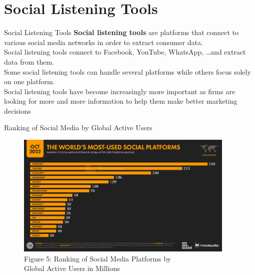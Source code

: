 \documentclass[pdf]{beamer}
\newcommand{\empr}[1]{{\color{franklinblue}\textbf{#1}}}
\theoremstyle{remark}
\theoremstyle{definition}
\begin{document}
\section{Social Listening Tools}

\begin{frame}[t]{Social Listening Tools}
\empr{Social listening tools} are platforms that connect to various social media networks in order to extract consumer data.  \\
\vspace{1.5ex}
Social listening tools connect to Facebook, YouTube, WhatsApp, \ldots and extract data from them. \\
\vspace{1.5ex}
Some social listening tools can handle several platforms while others focus solely on one platform. \\
\vspace{1.5ex}
Social listening tools have become increasingly more important as firms are looking for more and more information to help them make better marketing decisions
\end{frame}

\begin{frame}[t]{Ranking of Social Media by Global Active Users}
\begin{figure}[htbp]
  \captionsetup{justification=centering}
  \includegraphics[height=5.9cm, trim=0.0cm 0.0cm 0.0cm 0.0cm width=5.9cm]{Images/Hootsuite_SocialMedia_1022_1.png}
  \caption{Figure {\color{franklinblue} 5}: Ranking of Social Media Platforms by  \\ Global Active Users in Millions}
\end{figure}
\end{frame}
\end{document}
